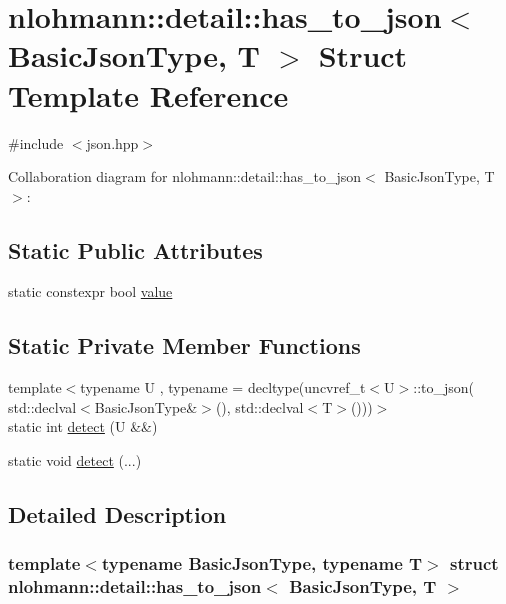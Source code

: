 \hypertarget{structnlohmann_1_1detail_1_1has__to__json}{}\section{nlohmann\+:\+:detail\+:\+:has\+\_\+to\+\_\+json$<$ Basic\+Json\+Type, T $>$ Struct Template Reference}
\label{structnlohmann_1_1detail_1_1has__to__json}


{\ttfamily \#include $<$json.\+hpp$>$}



Collaboration diagram for nlohmann\+:\+:detail\+:\+:has\+\_\+to\+\_\+json$<$ Basic\+Json\+Type, T $>$\+:
\subsection*{Static Public Attributes}
\begin{DoxyCompactItemize}
\item 
static constexpr bool \hyperlink{structnlohmann_1_1detail_1_1has__to__json_a18e260c3c6f10328637c4427d3cb3a31}{value}
\end{DoxyCompactItemize}
\subsection*{Static Private Member Functions}
\begin{DoxyCompactItemize}
\item 
{\footnotesize template$<$typename U , typename  = decltype(uncvref\+\_\+t$<$\+U$>$\+::to\+\_\+json(                 std\+::declval$<$\+Basic\+Json\+Type\&$>$(), std\+::declval$<$\+T$>$()))$>$ }\\static int \hyperlink{structnlohmann_1_1detail_1_1has__to__json_af087d9dfdab8443f2b95e8b6c8612742}{detect} (U \&\&)
\item 
static void \hyperlink{structnlohmann_1_1detail_1_1has__to__json_a133e6ab785874a224508769d960b1ab0}{detect} (...)
\end{DoxyCompactItemize}


\subsection{Detailed Description}
\subsubsection*{template$<$typename Basic\+Json\+Type, typename T$>$\newline
struct nlohmann\+::detail\+::has\+\_\+to\+\_\+json$<$ Basic\+Json\+Type, T $>$}



